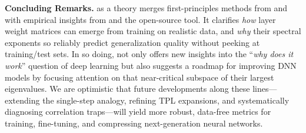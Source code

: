 \vspace{1em}
\noindent
\textbf{Concluding Remarks.}
\SETOL as a \SemiEmpirical theory merges first-principles methods from \STATMECH and \RMT with empirical 
insights from \HTSR and the open-source \WW tool. It clarifies \emph{how} \HeavyTailed  layer weight 
matrices can emerge from training on realistic data, and \emph{why} their spectral exponents so reliably 
predict generalization quality without peeking at training/test sets. In so doing, \SETOL not only offers 
new insights into the “\emph{why does it work}” question of deep learning but also suggests a roadmap for 
improving DNN models by focusing attention on that near-critical subspace of their largest 
eigenvalues. We are optimistic that future developments along these lines---extending the single-step 
\RenormalizationGroup analogy, refining TPL expansions, and systematically diagnosing correlation 
traps---will yield more robust, data-free metrics for training, fine-tuning, and compressing next-generation 
neural networks. 
